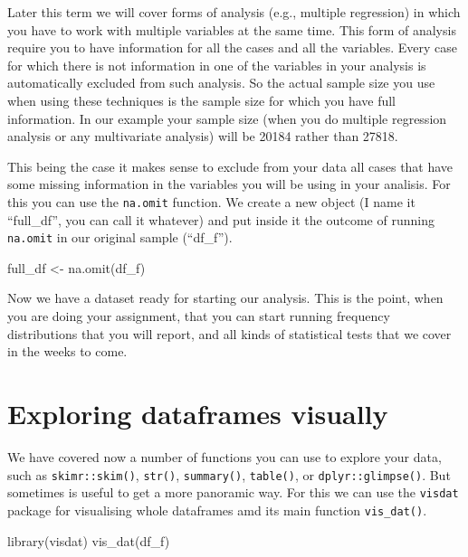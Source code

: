 \documentclass[
]{book}
\newenvironment{Shaded}{\begin{snugshade}}{\end{snugshade}}
\newcommand{\FunctionTok}[1]{\textcolor[rgb]{0.00,0.00,0.00}{#1}}
\newcommand{\NormalTok}[1]{#1}
\newcommand{\OtherTok}[1]{\textcolor[rgb]{0.56,0.35,0.01}{#1}}
\begin{document}
Later this term we will cover forms of analysis (e.g., multiple regression) in which you have to work with multiple variables at the same time. This form of analysis require you to have information for all the cases and all the variables. Every case for which there is not information in one of the variables in your analysis is automatically excluded from such analysis. So the actual sample size you use when using these techniques is the sample size for which you have full information. In our example your sample size (when you do multiple regression analysis or any multivariate analysis) will be 20184 rather than 27818.

This being the case it makes sense to exclude from your data all cases that have some missing information in the variables you will be using in your analisis. For this you can use the \texttt{na.omit} function. We create a new object (I name it ``full\_df'', you can call it whatever) and put inside it the outcome of running \texttt{na.omit} in our original sample (``df\_f'').

\begin{Shaded}
\begin{Highlighting}[]
\NormalTok{full\_df }\OtherTok{\textless{}{-}} \FunctionTok{na.omit}\NormalTok{(df\_f)}
\end{Highlighting}
\end{Shaded}

Now we have a dataset ready for starting our analysis. This is the point, when you are doing your assignment, that you can start running frequency distributions that you will report, and all kinds of statistical tests that we cover in the weeks to come.

\hypertarget{exploring-dataframes-visually}{%
\section{Exploring dataframes visually}\label{exploring-dataframes-visually}}

We have covered now a number of functions you can use to explore your data, such as \texttt{skimr::skim()}, \texttt{str()}, \texttt{summary()}, \texttt{table()}, or \texttt{dplyr::glimpse()}. But sometimes is useful to get a more panoramic way. For this we can use the \texttt{visdat} package for visualising whole dataframes amd its main function \texttt{vis\_dat()}.

\begin{Shaded}
\begin{Highlighting}[]
\FunctionTok{library}\NormalTok{(visdat)}
\FunctionTok{vis\_dat}\NormalTok{(df\_f)}
\end{Highlighting}
\end{Shaded}
\end{document}

